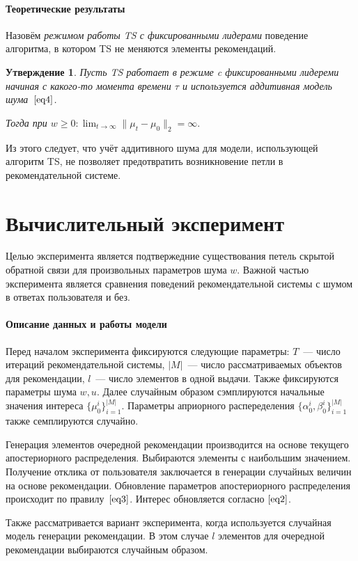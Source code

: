 \documentclass[12pt, twoside]{article}
\newtheorem{statement}{Утверждение}
\begin{document}
\paragraph{Теоретические результаты}
Назовём \textit{режимом работы TS с фиксированными лидерами} поведение алгоритма, в котором TS не меняются элементы рекомендаций.

\begin{statement}
  Пусть  TS работает в режиме c фиксированными лидереми начиная с какого-то момента времени $\tau$ и используется аддитивная модель шума~$\eqref{eq4}$. 

  Тогда при $w \geq 0 : \lim_{t \to \infty} \|\mu_t - \mu_0 \|_2 = \infty.$
\end{statement}

Из этого следует, что учёт аддитивного шума для модели, использующей алгоритм TS, не позволяет предотвратить возникновение петли в рекомендательной системе.
 
\section{Вычислительный эксперимент}
Целью эксперимента является подтвержедние существования петель скрытой обратной связи для произвольных параметров шума $w$. 
Важной частью эксперимента является сравнения поведений рекомендательной системы с шумом в ответах пользователя и без. 

\paragraph{Описание данных и работы модели}
Перед началом эксперимента фиксируются следующие параметры: $T$~--- число итераций рекомендательной системы, $|M|$~--- число рассматриваемых объектов для рекомендации, $l$~--- число элементов в одной выдачи. 
Также фиксируются параметры шума $w, u$.
Далее случайным образом сэмплируются начальные значения интереса $\{\mu_0^i\}_{i=1}^{|M|}$. 
Параметры априорного распеределения $\{\alpha_0^i, \beta_0^i\}_{i=1}^{|M|}$  также семплируются случайно.

Генерация элементов очередной рекомендации производится на основе текущего апостериорного распределения. 
Выбираются элементы с наибольшим значением. 
Получение отклика от пользователя заключается в генерации случайных величин на основе рекомендации.
Обновление параметров апостериорного распределения происходит по правилу~$\eqref{eq3}$. 
Интерес обновляется согласно $\eqref{eq2}$.

Также рассматривается вариант эксперимента, когда используется случайная модель генерации рекомендации. 
В этом случае $l$ элементов для очередной рекомендации выбираются случайным образом. 
\end{document}

